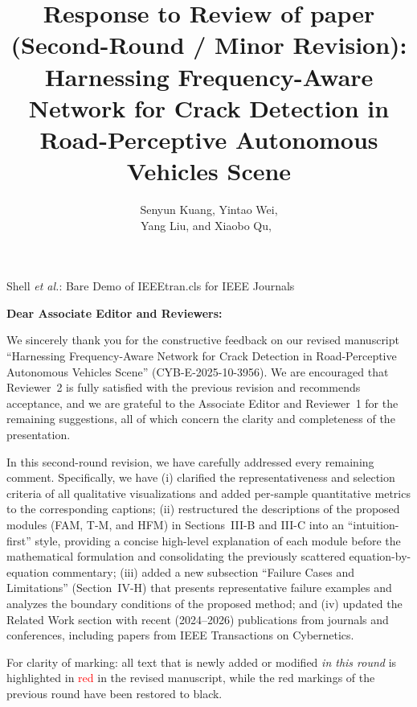 \documentclass[lettersize,journal,onecolumn,12pt]{IEEEtran}
\begin{document}

\title{Response to Review of paper (Second-Round / Minor Revision):\\
Harnessing Frequency-Aware Network for Crack Detection in Road-Perceptive Autonomous Vehicles Scene}

\author{Senyun Kuang, Yintao Wei,

Yang Liu, and Xiaobo Qu,~
}

%
{Shell \MakeLowercase{\textit{et al.}}: Bare Demo of IEEEtran.cls for IEEE Journals}

\maketitle

\textbf{Dear Associate Editor and Reviewers:}

We sincerely thank you for the constructive feedback on our revised manuscript
``Harnessing Frequency-Aware Network for Crack Detection in Road-Perceptive Autonomous Vehicles Scene''
(CYB-E-2025-10-3956).
We are encouraged that Reviewer~2 is fully satisfied with the previous revision and recommends acceptance,
and we are grateful to the Associate Editor and Reviewer~1 for the remaining suggestions,
all of which concern the clarity and completeness of the presentation.

In this second-round revision, we have carefully addressed every remaining comment. Specifically, we have
(i) clarified the representativeness and selection criteria of all qualitative visualizations and added
per-sample quantitative metrics to the corresponding captions;
(ii) restructured the descriptions of the proposed modules (FAM, T-M, and HFM) in Sections~III-B and III-C
into an ``intuition-first'' style, providing a concise high-level explanation of each module before the mathematical
formulation and consolidating the previously scattered equation-by-equation commentary;
(iii) added a new subsection ``Failure Cases and Limitations'' (Section~IV-H) that presents representative failure
examples and analyzes the boundary conditions of the proposed method; and
(iv) updated the Related Work section with recent (2024--2026) publications from journals and conferences,
including papers from IEEE Transactions on Cybernetics.

For clarity of marking: all text that is newly added or modified \emph{in this round} is highlighted in
\textcolor{red}{red} in the revised manuscript, while the red markings of the previous round have been restored
to black.
\end{document}
